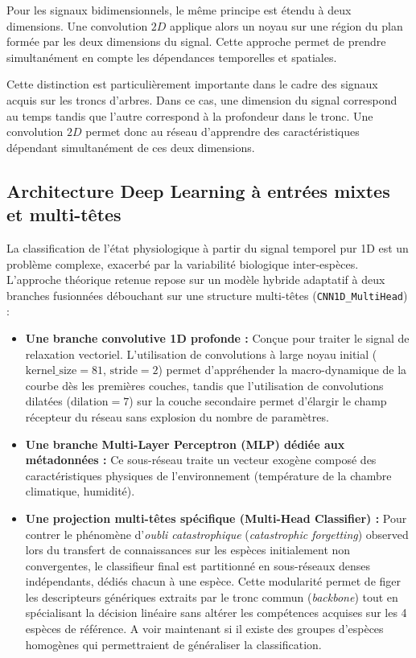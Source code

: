 \documentclass[12pt,a4paper,twoside]{article}
\begin{document}
Pour les signaux bidimensionnels, le même principe est étendu à deux dimensions. Une convolution $2D$ applique alors un noyau sur une région du plan formée par les deux dimensions du signal. Cette approche permet de prendre simultanément en compte les dépendances temporelles et spatiales.

Cette distinction est particulièrement importante dans le cadre des signaux acquis sur les troncs d'arbres. Dans ce cas, une dimension du signal correspond au temps tandis que l'autre correspond à la profondeur dans le tronc. Une convolution $2D$ permet donc au réseau d'apprendre des caractéristiques dépendant simultanément de ces deux dimensions.

\subsection{Architecture Deep Learning à entrées mixtes et multi-têtes}
\label{subsec:architecture_theorique}

La classification de l'état physiologique à partir du signal temporel pur 1D est un problème complexe, exacerbé par la variabilité biologique inter-espèces. L'approche théorique retenue repose sur un modèle hybride adaptatif à deux branches fusionnées débouchant sur une structure multi-têtes (\texttt{CNN1D\_MultiHead}) :
\begin{itemize}
    \item \textbf{Une branche convolutive 1D profonde :} Conçue pour traiter le signal de relaxation vectoriel. L'utilisation de convolutions à large noyau initial ($\text{kernel\_size}=81$, $\text{stride}=2$) permet d'appréhender la macro-dynamique de la courbe dès les premières couches, tandis que l'utilisation de convolutions dilatées ($\text{dilation}=7$) sur la couche secondaire permet d'élargir le champ récepteur du réseau sans explosion du nombre de paramètres.
    
    \item \textbf{Une branche Multi-Layer Perceptron (MLP) dédiée aux métadonnées :} Ce sous-réseau traite un vecteur exogène composé des caractéristiques physiques de l'environnement (température de la chambre climatique, humidité).
    
    \item \textbf{Une projection multi-têtes spécifique (Multi-Head Classifier) :} Pour contrer le phénomène d'\textit{oubli catastrophique} (\textit{catastrophic forgetting}) observed lors du transfert de connaissances sur les espèces initialement non convergentes, le classifieur final est partitionné en sous-réseaux denses indépendants, dédiés chacun à une espèce. Cette modularité permet de figer les descripteurs génériques extraits par le tronc commun (\textit{backbone}) tout en spécialisant la décision linéaire sans altérer les compétences acquises sur les 4 espèces de référence. A voir maintenant si il existe des groupes d'espèces homogènes qui permettraient de généraliser la classification.
\end{itemize}
\end{document}
